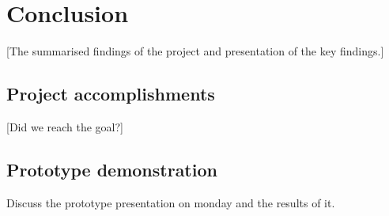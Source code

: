 \section{Conclusion}\label{Conclusion}
[The summarised findings of the project and presentation of the key findings.]
    \subsection{Project accomplishments}\label{Project accomplishments}
    [Did we reach the goal?]
    
    
    \subsection{Prototype demonstration}\label{Prototype Demonstration}
    Discuss the prototype presentation on monday  and the results of it. 
